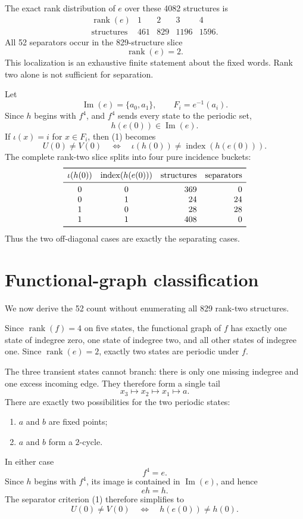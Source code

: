 \documentclass[10pt]{article}
\newcommand{\rank}{\operatorname{rank}}
\newcommand{\Img}{\operatorname{Im}}
\begin{document}
The exact rank distribution of $e$ over these 4082 structures is
\[
\begin{array}{c|rrrr}
\rank(e)&1&2&3&4\\
\hline
\text{structures}&461&829&1196&1596.
\end{array}
\]
All 52 separators occur in the 829-structure slice
\[
\rank(e)=2.
\]
This localization is an exhaustive finite statement about the fixed words. Rank two alone is not sufficient for separation.

Let
\[
\Img(e)=\{a_0,a_1\},\qquad F_i=e^{-1}(a_i).
\]
Since $h$ begins with $f^4$, and $f^4$ sends every state to the periodic set,
\[
h(e(0))\in\Img(e).
\]
If $\iota(x)=i$ for $x\in F_i$, then (1) becomes
\begin{equation}
U(0)\neq V(0)
\quad\Longleftrightarrow\quad
\iota(h(0))
\neq
\operatorname{index}(h(e(0))).
\tag{2}
\end{equation}
The complete rank-two slice splits into four pure incidence buckets:
\[
\begin{array}{ccrr}
\toprule
\iota(h(0))&
\operatorname{index}(h(e(0)))&
\text{structures}&
\text{separators}\\
\midrule
0&0&369&0\\
0&1&24&24\\
1&0&28&28\\
1&1&408&0\\
\bottomrule
\end{array}
\]
Thus the two off-diagonal cases are exactly the separating cases.

\section{Functional-graph classification}

We now derive the 52 count without enumerating all 829 rank-two structures.

Since $\rank(f)=4$ on five states, the functional graph of $f$ has exactly one state of indegree zero, one state of indegree two, and all other states of indegree one. Since $\rank(e)=2$, exactly two states are periodic under $f$.

The three transient states cannot branch: there is only one missing indegree and one excess incoming edge. They therefore form a single tail
\[
x_3\longmapsto x_2\longmapsto x_1\longmapsto a.
\]
There are exactly two possibilities for the two periodic states:
\begin{enumerate}
\item $a$ and $b$ are fixed points;
\item $a$ and $b$ form a $2$-cycle.
\end{enumerate}
In either case
\[
f^4=e.
\]
Since $h$ begins with $f^4$, its image is contained in $\Img(e)$, and hence
\[
eh=h.
\]
The separator criterion (1) therefore simplifies to
\begin{equation}
U(0)\neq V(0)
\quad\Longleftrightarrow\quad
h(e(0))\neq h(0).
\tag{3}
\end{equation}
\end{document}

